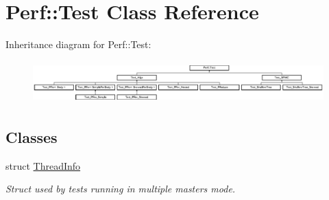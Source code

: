 \hypertarget{classPerf_1_1Test}{}\section{Perf\+:\+:Test Class Reference}
\label{classPerf_1_1Test}
Inheritance diagram for Perf\+:\+:Test\+:\begin{figure}[H]
\begin{center}
\leavevmode
\includegraphics[height=1.641026cm]{classPerf_1_1Test}
\end{center}
\end{figure}
\subsection*{Classes}
\begin{DoxyCompactItemize}
\item 
struct \hyperlink{structPerf_1_1Test_1_1ThreadInfo}{Thread\+Info}
\begin{DoxyCompactList}\small\item\em Struct used by tests running in multiple masters mode. \end{DoxyCompactList}\end{DoxyCompactItemize}
